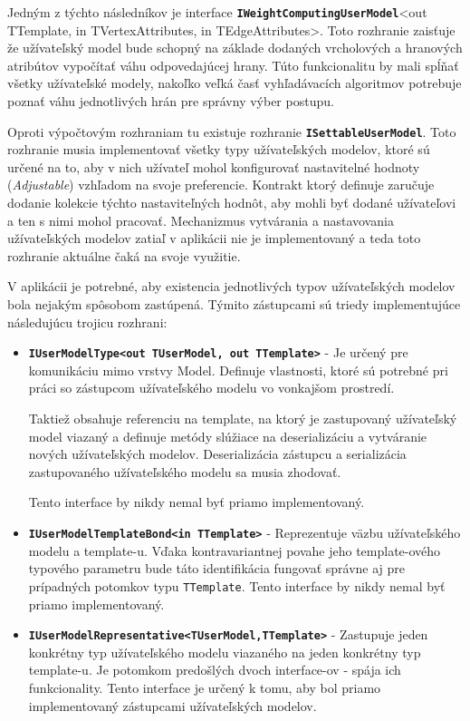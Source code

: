 Jedným z týchto následníkov je interface \textbf{\texttt{IWeightComputingUserModel}}<out TTemplate, in TVertexAttributes, in TEdgeAttributes>. Toto rozhranie zaisťuje že užívateľský model bude schopný na základe dodaných vrcholových a hranových atribútov vypočítať váhu odpovedajúcej hrany. Túto funkcionalitu by mali spĺňať všetky užívateľské modely, nakoľko veľká časť vyhľadávacích algoritmov potrebuje poznať váhu jednotlivých hrán pre správny výber postupu.

Oproti výpočtovým rozhraniam tu existuje rozhranie \textbf{\texttt{ISettableUserModel}}. Toto rozhranie musia implementovať všetky typy užívateľských modelov, ktoré sú určené na to, aby v nich užívateľ mohol konfigurovať nastavitelné hodnoty (\textit{Adjustable}) vzhľadom na svoje preferencie. Kontrakt ktorý definuje zaručuje dodanie kolekcie týchto nastaviteľných hodnôt, aby mohli byť dodané užívateľovi a ten s nimi mohol pracovať. Mechanizmus vytvárania a nastavovania užívateľských modelov zatiaľ v aplikácii nie je implementovaný a teda toto rozhranie aktuálne čaká na svoje využitie.  

\bigskip

V aplikácii je potrebné, aby existencia jednotlivých typov užívateľských modelov bola nejakým spôsobom zastúpená. Týmito zástupcami sú triedy implementujúce následujúcu trojicu rozhrani:
\begin{itemize}
    \item \textbf{\texttt{IUserModelType<out TUserModel, out TTemplate>}} - Je určený pre komunikáciu mimo vrstvy Model. Definuje vlastnosti, ktoré sú potrebné pri práci so zástupcom užívateľského modelu vo vonkajšom prostredí. 
    
    Taktiež obsahuje referenciu na template, na ktorý je zastupovaný užívateľský model viazaný a definuje metódy slúžiace na deserializáciu a vytváranie nových užívateľských modelov. Deserializácia zástupcu a serializácia zastupovaného užívateľského modelu sa musia zhodovať. 
    
    Tento interface by nikdy nemal byť priamo implementovaný.
    \item \textbf{\texttt{IUserModelTemplateBond<in TTemplate>}} - Reprezentuje väzbu užívateľského modelu a template-u.  Vďaka kontravariantnej povahe jeho template-ového typového parametru bude táto identifikácia fungovať správne aj pre prípadných potomkov typu \texttt{TTemplate}. Tento interface by nikdy nemal byť priamo implementovaný.
    \item \textbf{\texttt{IUserModelRepresentative<TUserModel,TTemplate>}} - Zastupuje jeden konkrétny typ užívateľského modelu viazaného na jeden konkrétny typ template-u. Je potomkom predošlých dvoch interface-ov - spája ich funkcionality. Tento interface je určený k tomu, aby bol priamo implementovaný zástupcami užívateľských modelov.   
\end{itemize}

